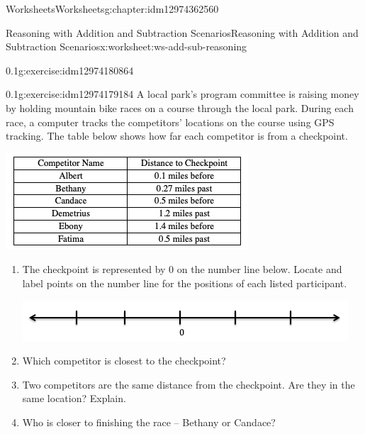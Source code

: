 \documentclass[twoside,11pt,]{book}
\begin{document}
\begin{chapterptx}{Worksheets}{}{Worksheets}{}{}{g:chapter:idm12974362560}
\begin{worksheet-section-numberless}{Reasoning with Addition and Subtraction Scenarios}{}{Reasoning with Addition and Subtraction Scenarios}{}{}{x:worksheet:ws-add-sub-reasoning}
\begin{divisionexercise}{4}{}{0.1}{g:exercise:idm12974180864}
\end{divisionexercise}%
\begin{divisionexercise}{5}{}{0.1}{g:exercise:idm12974179184}%
A local park’s program committee is raising money by holding mountain bike races on a course through the local park.  During each race, a computer tracks the competitors’ locations on the course using GPS tracking.  The table below shows how far each competitor is from a checkpoint.%
\begin{sidebyside}{1}{0.05}{0.05}{0}%
\begin{sbspanel}{0.9}%
\includegraphics[width=1\linewidth]{images/reasoning-table-checkpoint.png}
\end{sbspanel}%
\end{sidebyside}%
%
\begin{enumerate}[label=(\alph*)]
\item{}The checkpoint is represented by 0 on the number line below.  Locate and label points on the number line for the positions of each listed participant. \begin{sidebyside}{1}{0.05}{0.05}{0}%
\begin{sbspanel}{0.9}%
\includegraphics[width=1\linewidth]{images/blank-number-line.png}
\end{sbspanel}%
\end{sidebyside}%
%
\item{}Which competitor is closest to the checkpoint?%
\item{}Two competitors are the same distance from the checkpoint.  Are they in the same location?  Explain.%
\item{}Who is closer to finishing the race – Bethany or Candace?%
\end{enumerate}
\end{divisionexercise}%

\end{worksheet-section-numberless}
\end{chapterptx}
\end{document}
